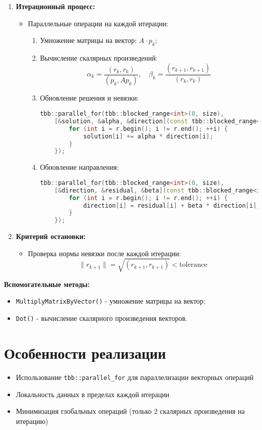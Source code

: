 \documentclass[12pt]{article}
\begin{document}
\begin{enumerate}
  \item \textbf{Итерационный процесс:}
  \begin{itemize}
    \item Параллельные операции на каждой итерации:
    \begin{enumerate}
      \item Умножение матрицы на вектор: $A \cdot p_k$;
      \item Вычисление скалярных произведений:
      \[
      \alpha_k = \frac{(r_k, r_k)}{(p_k, A p_k)}, \quad \beta_k = \frac{(r_{k+1}, r_{k+1})}{(r_k, r_k)}
      \]
      \item Обновление решения и невязки:
\begin{lstlisting}[language=C++]
tbb::parallel_for(tbb::blocked_range<int>(0, size),
    [&solution, &alpha, &direction](const tbb::blocked_range<int>& r) {
        for (int i = r.begin(); i != r.end(); ++i) {
            solution[i] += alpha * direction[i];
        }
    });
\end{lstlisting}
      \item Обновление направления:
\begin{lstlisting}[language=C++]
tbb::parallel_for(tbb::blocked_range<int>(0, size),
    [&direction, &residual, &beta](const tbb::blocked_range<int>& r) {
        for (int i = r.begin(); i != r.end(); ++i) {
            direction[i] = residual[i] + beta * direction[i];
        }
    });
\end{lstlisting}
    \end{enumerate}
  \end{itemize}

  \item \textbf{Критерий остановки:}
  \begin{itemize}
    \item Проверка нормы невязки после каждой итерации:
    \[
    \|r_{k+1}\| = \sqrt{(r_{k+1}, r_{k+1})} < \text{tolerance}
    \]
  \end{itemize}
\end{enumerate}

\textbf{Вспомогательные методы:}
\begin{itemize}
  \item \texttt{MultiplyMatrixByVector()} - умножение матрицы на вектор;
  \item \texttt{Dot()} - вычисление скалярного произведения векторов.
\end{itemize}

\section*{Особенности реализации}
\begin{itemize}
  \item Использование \texttt{tbb::parallel\_for} для параллелизации векторных операций
  \item Локальность данных в пределах каждой итерации
  \item Минимизация глобальных операций (только 2 скалярных произведения на итерацию)
\end{itemize}
\end{document}
